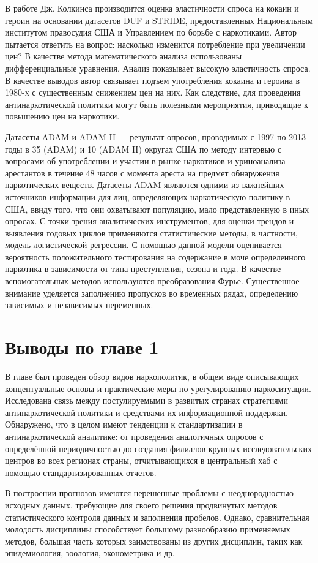 В работе Дж. Колкинса \cite{Caulkins1995} производится оценка эластичности спроса 
на кокаин и героин на основании датасетов DUF и STRIDE, предоставленных
Национальным институтом правосудия США и Управлением по борьбе с наркотиками.
Автор пытается ответить на вопрос: насколько изменится потребление при
увеличении цен? В качестве метода математического анализа использованы
дифференциальные уравнения. Анализ показывает высокую эластичность спроса. В
качестве выводов автор связывает подъем употребления кокаина и героина в 1980-х
с существенным снижением цен на них. Как следствие, для проведения
антинаркотической политики могут быть полезными мероприятия, приводящие к
повышению цен на наркотики.

Датасеты ADAM и ADAM II --- результат опросов, проводимых с 1997 по 2013 годы в
35 (ADAM) и 10 (ADAM II) округах США по методу интервью с вопросами об
употреблении и участии в рынке наркотиков и уриноанализа арестантов в течение 48
часов с момента ареста на предмет обнаружения наркотических
веществ\cite{Hunt2013, Chapman2010}. Датасеты ADAM являются одними из
важнейших источников информации для лиц, определяющих наркотическую политику в
США, ввиду того, что они охватывают популяцию, мало представленную в иных
опросах. С точки зрения аналитических инструментов, для оценки трендов и
выявления годовых циклов применяются статистические методы, в частности, модель
логистической регрессии.  С помощью данной модели оценивается вероятность
положительного тестирования на содержание в моче определенного наркотика в
зависимости от типа преступления, сезона и года. В качестве вспомогательных
методов используются преобразования Фурье. Существенное внимание уделяется
заполнению пропусков во временных рядах, определению зависимых и независимых
переменных.

\section*{Выводы по главе 1}

В главе был проведен обзор видов наркополитик, в общем виде описывающих
концептуальные основы и практические меры по урегулированию наркоситуации.
Исследована связь между постулируемыми в развитых странах стратегиями
антинаркотической политики и средствами их информационной поддержки. Обнаружено,
что в целом имеют тенденции к стандартизации в антинаркотической аналитике: от
проведения аналогичных опросов с определённой периодичностью до создания
филиалов крупных исследовательских центров во всех регионах страны,
отчитывающихся в центральный хаб с помощью стандартизированных отчетов.

В построении прогнозов имеются нерешенные проблемы с неоднородностью исходных
данных, требующие для своего решения продвинутых методов статистического
контроля данных и заполнения пробелов. Однако, сравнительная молодость
дисциплины способствует большому разнообразию применяемых методов, большая часть
которых заимствованы из других дисциплин, таких как эпидемиология, зоология,
эконометрика и др.

